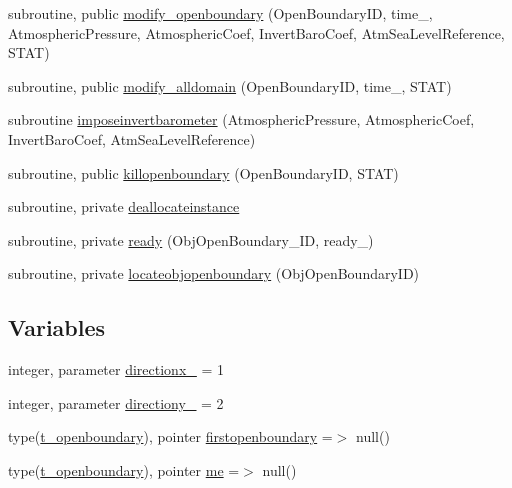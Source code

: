 \begin{DoxyCompactItemize}
\item 
subroutine, public \mbox{\hyperlink{namespacemoduleopenboundary_ab4eb76c328f66777a2d624134933208e}{modify\+\_\+openboundary}} (Open\+Boundary\+ID, time\+\_\+, Atmospheric\+Pressure, Atmospheric\+Coef, Invert\+Baro\+Coef, Atm\+Sea\+Level\+Reference, S\+T\+AT)
\item 
subroutine, public \mbox{\hyperlink{namespacemoduleopenboundary_aff2a2f4ab16c35a036f9e00575fed103}{modify\+\_\+alldomain}} (Open\+Boundary\+ID, time\+\_\+, S\+T\+AT)
\item 
subroutine \mbox{\hyperlink{namespacemoduleopenboundary_a286febb2e6ff9645adfa5b2e89882bcb}{imposeinvertbarometer}} (Atmospheric\+Pressure, Atmospheric\+Coef, Invert\+Baro\+Coef, Atm\+Sea\+Level\+Reference)
\item 
subroutine, public \mbox{\hyperlink{namespacemoduleopenboundary_aeb84e486854c5a1124aae3804680b09b}{killopenboundary}} (Open\+Boundary\+ID, S\+T\+AT)
\item 
subroutine, private \mbox{\hyperlink{namespacemoduleopenboundary_a6b40de889bc24c11e911ca6efb54e645}{deallocateinstance}}
\item 
subroutine, private \mbox{\hyperlink{namespacemoduleopenboundary_af8f8c38fee04ad167eec9a779f717d85}{ready}} (Obj\+Open\+Boundary\+\_\+\+ID, ready\+\_\+)
\item 
subroutine, private \mbox{\hyperlink{namespacemoduleopenboundary_a574d2a20bc25ffca8219ecde4cb1c29f}{locateobjopenboundary}} (Obj\+Open\+Boundary\+ID)
\end{DoxyCompactItemize}
\subsection*{Variables}
\begin{DoxyCompactItemize}
\item 
integer, parameter \mbox{\hyperlink{namespacemoduleopenboundary_a34fb62c3d7f54754cad4022cbdadaa4f}{directionx\+\_\+}} = 1
\item 
integer, parameter \mbox{\hyperlink{namespacemoduleopenboundary_a25093200fa39f8e59e871125514b1a8c}{directiony\+\_\+}} = 2
\item 
type(\mbox{\hyperlink{structmoduleopenboundary_1_1t__openboundary}{t\+\_\+openboundary}}), pointer \mbox{\hyperlink{namespacemoduleopenboundary_a6692caf14af89aa0ebe8696badd01729}{firstopenboundary}} =$>$ null()
\item 
type(\mbox{\hyperlink{structmoduleopenboundary_1_1t__openboundary}{t\+\_\+openboundary}}), pointer \mbox{\hyperlink{namespacemoduleopenboundary_a44c6fe241aef5c76ee470c9d68f19a74}{me}} =$>$ null()
\end{DoxyCompactItemize}



